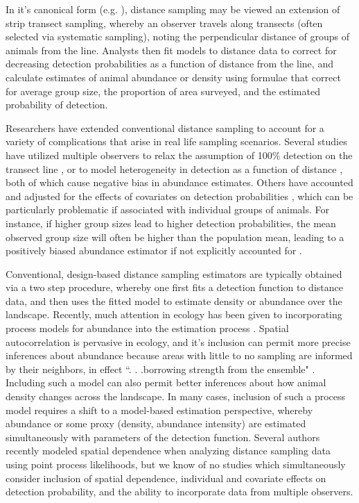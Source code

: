\documentclass[10pt]{article}
\begin{document}
In it's canonical form (e.g. \cite{BurnhamEtAl1980}), distance sampling may be viewed an extension of strip transect sampling, whereby an observer travels along transects (often selected via systematic sampling), noting the perpendicular distance of groups of animals from the line.  Analysts then fit models to distance data to correct for decreasing detection probabilities as a function of distance from the line, and calculate estimates of animal abundance or density using formulae that correct for average group size, the proportion of area surveyed, and the estimated probability of detection.

Researchers have extended conventional distance sampling to account for a variety of complications that arise in real life sampling scenarios.  Several studies have utilized multiple observers to relax the assumption of 100\% detection on the transect line \cite{BorchersEtAl1998}, or to model heterogeneity in detection as a function of distance \cite{BorchersEtAl2006,BucklandEtAl2010}, both of which cause negative bias in abundance estimates.  Others have accounted and adjusted for the effects of covariates on detection probabilities \cite{DrummerMcdonald1987,RamseyEtAl1987,MarquesBuckland2003}, which can be particularly problematic if associated with individual groups of animals.  For instance, if higher group sizes lead to higher detection probabilities, the mean observed group size will often be higher than the population mean, leading to a positively biased abundance estimator if not explicitly accounted for \cite{DrummerMcdonald1987}.

Conventional, design-based distance sampling estimators are typically obtained via a two step procedure, whereby one first fits a detection function to distance data, and then uses the fitted model to estimate density or abundance over the landscape. Recently, much attention in ecology has been given to incorporating process models for abundance into the estimation process \cite{RoyleEtAl2004,RoyleEtAl2007}.  Spatial autocorrelation is pervasive in ecology, and it's inclusion can permit more precise inferences about abundance because areas with little to no sampling are informed by their neighbors, in effect ``. . .borrowing strength from the ensemble" \cite{Morris1983}.  Including such a model can also permit better inferences about how animal density changes across the landscape. In many cases, inclusion of such a process model requires a shift to a model-based estimation perspective, whereby abundance or some proxy (density, abundance intensity) are estimated simultaneously with parameters of the detection function. Several authors recently modeled spatial dependence when analyzing distance sampling data \cite{HedleyBuckland2004,JohnsonEtAl2010} using point process likelihoods, but we know of no studies which simultaneously consider inclusion of spatial dependence, individual and covariate effects on detection probability, and the ability to incorporate data from multiple observers.
\end{document}
